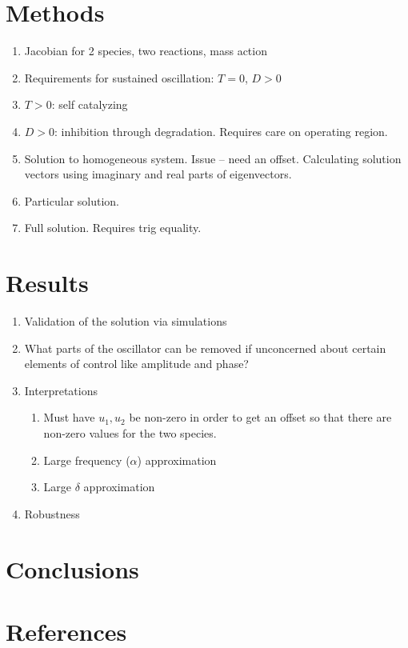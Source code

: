\documentclass[11pt]{elsarticle}
\begin{document}
\section*{Methods}
\begin{enumerate}
    \item Jacobian for 2 species, two reactions, mass action
    \item Requirements for sustained oscillation: $T = 0$, $D > 0$
    \item $T> 0$: self catalyzing
    \item $D > 0$: inhibition through degradation. Requires care on operating region.
    \item Solution to homogeneous system. Issue -- need an offset. Calculating solution vectors using imaginary and real parts of eigenvectors.
    \item Particular solution.
    \item Full solution. Requires trig equality.
\end{enumerate}

\section*{Results}
\begin{enumerate}
    \item Validation of the solution via simulations
    \item What parts of the oscillator can be removed if unconcerned about certain elements of control like amplitude and phase?
    \item Interpretations
    \begin{enumerate}
        \item Must have $u_1, u_2$ be non-zero in order to get an offset so that there are non-zero values for the two species.
        \item Large frequency ($\alpha$) approximation
        \item Large $\delta$ approximation
    \end{enumerate}
    \item Robustness
\end{enumerate}

\section*{Conclusions}


\section*{References}

\end{document}
